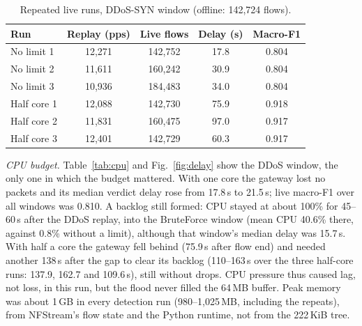 \begin{table}[t]
\centering
\caption{Repeated live runs, DDoS-SYN window (offline: 142,724 flows).}
\label{tab:repeats}
\footnotesize
\setlength{\tabcolsep}{3pt}
\begin{tabular}{|l|c|c|c|c|}
\hline
Run & Replay (pps) & Live flows & Delay (s) & Macro-F1 \\
\hline
No limit 1 & 12,271 & 142,752 & 17.8 & 0.804 \\
No limit 2 & 11,611 & 160,242 & 30.9 & 0.804 \\
No limit 3 & 10,936 & 184,483 & 34.0 & 0.804 \\
Half core 1 & 12,088 & 142,730 & 75.9 & 0.918 \\
Half core 2 & 11,831 & 160,475 & 97.0 & 0.917 \\
Half core 3 & 12,401 & 142,729 & 60.3 & 0.917 \\
\hline
\end{tabular}
\end{table}

\emph{CPU budget.} Table~\ref{tab:cpu} and Fig.~\ref{fig:delay} show the DDoS window, the only one in which the budget mattered. With one core the gateway lost no packets and its median verdict delay rose from 17.8\,s to 21.5\,s; live macro-F1 over all windows was 0.810. A backlog still formed: CPU stayed at about 100\% for 45--60\,s after the DDoS replay, into the BruteForce window (mean CPU 40.6\% there, against 0.8\% without a limit), although that window's median delay was 15.7\,s. With half a core the gateway fell behind (75.9\,s after flow end) and needed another 138\,s after the gap to clear its backlog (110--163\,s over the three half-core runs: 137.9, 162.7 and 109.6\,s), still without drops. CPU pressure thus caused lag, not loss, in this run, but the flood never filled the 64\,MB buffer. Peak memory was about 1\,GB in every detection run (980--1,025\,MB, including the repeats), from NFStream's flow state and the Python runtime, not from the 222\,KiB tree.

